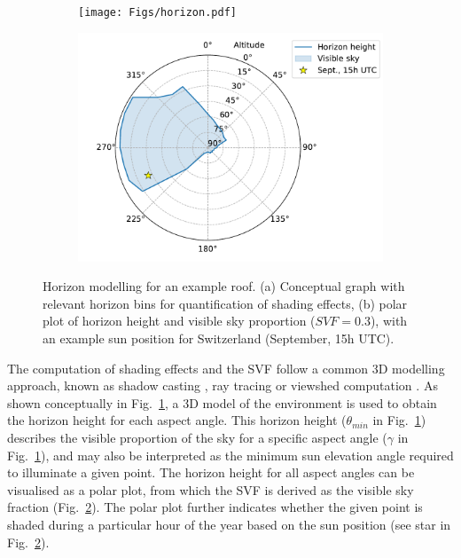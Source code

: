 \begin{figure}[tb!]
	\centering
	\begin{subfigure}[t]{.49\textwidth}
		\centering
		\texttt{[image: Figs/horizon.pdf]}  
		\subcaption{}
        \label{figa:horizon_method}
	\end{subfigure}
	\begin{subfigure}[t]{.49\textwidth}
		\centering
		\includegraphics[width=\linewidth]{images/Figs/skyview_point_w_star.pdf}  
		\subcaption{}
		\label{figb:horizon_method}
	\end{subfigure}
	\caption{Horizon modelling for an example roof. (a) Conceptual graph with relevant horizon bins for quantification of shading effects, (b) polar plot of horizon height and visible sky proportion ($\mathit{SVF} = 0.3$), with an example sun position for Switzerland (September, 15h UTC).}
	\label{fig:horizon_method}
\end{figure}

The computation of shading effects and the SVF follow a common 3D modelling approach, known as shadow casting \cite{levinson_solar_2009,desthieux_solar_2018}, ray tracing \cite{jakubiec_method_2013} or viewshed computation \cite{nguyen_incorporating_2012}. 
As shown conceptually in Fig.~\ref{figa:horizon_method}, a 3D model of the environment is used to obtain the horizon height for each aspect angle. 
%
This horizon height ($\theta_\mathit{min}$ in Fig.~\ref{figa:horizon_method}) describes the visible proportion of the sky for a specific aspect angle ($\gamma$ in Fig.~\ref{figa:horizon_method}), and may also be interpreted as the minimum sun elevation angle required to illuminate a given point. 
%
The horizon height for all aspect angles can be visualised as a polar plot, from which the SVF is derived as the visible sky fraction (Fig.~\ref{figb:horizon_method}). The polar plot further indicates whether the given point is shaded during a particular hour of the year based on the sun position (see star in Fig.~\ref{figb:horizon_method}).

